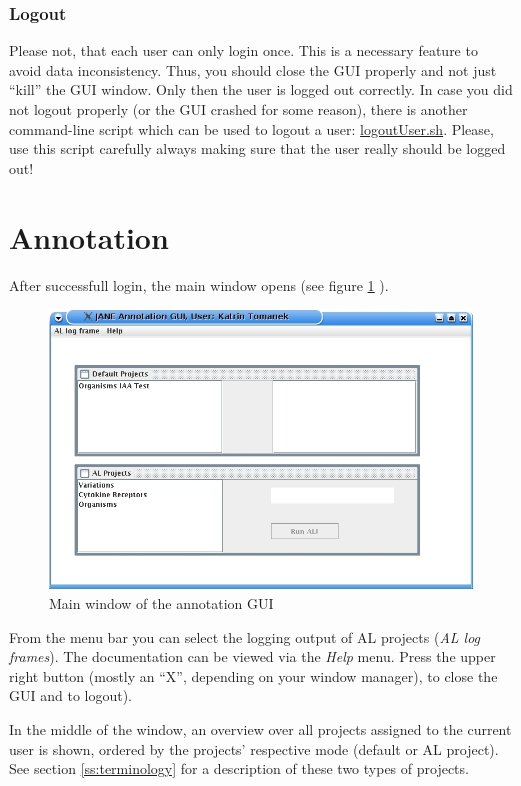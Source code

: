 \documentclass[DIV12,english,11pt,halfparskip]{scrartcl}
\begin{document}
\subsubsection{Logout}
Please not, that each user can only login once. This is a necessary
feature to avoid data inconsistency. Thus, you should close the GUI
properly and not just ``kill'' the GUI window. Only then the user is
logged out correctly. In case you did not logout properly (or the GUI
crashed for some reason), there is another command-line script which
can be used to logout a user: \url{logoutUser.sh}. Please, use this
script carefully always making sure that the user really should be
logged out!



\section{Annotation}
After successfull login, the main window opens (see figure
\ref{fig:annoclientfigure} ).

\begin{figure}[h]
  \centering
  \includegraphics[scale=0.4]{figs/AnnoClientOnStartup.jpg}
  \caption{Main window of the annotation GUI}
  \label{fig:annoclientfigure}
\end{figure}

From the menu bar you can select the logging output of AL projects
(\textit{AL log frames}). The documentation can be viewed via the
\textit{Help} menu. Press the upper right button (mostly an ``X'',
depending on your window manager), to close the GUI and to
logout).

In the middle of the window, an overview over all projects assigned to
the current user is shown, ordered by the projects' respective mode
(default or AL project). See section \ref{ss:terminology} for a
description of these two types of projects.
\end{document}
